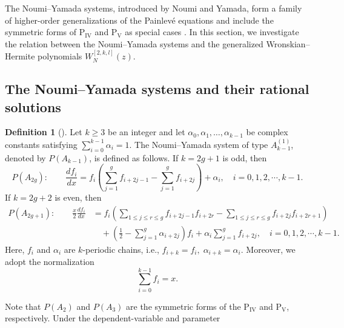 \documentclass[preprint,3p,10pt]{elsarticle}
\theoremstyle{definition}
\newtheorem{definition}{Definition}[section]
\begin{document}
The Noumi--Yamada systems, introduced by Noumi and Yamada, form a family of higher-order generalizations of the Painlev\'e equations and include the symmetric forms of P\(_{\mathrm{IV}}\) and P\(_{\mathrm{V}}\) as special cases \cite{noumi1998affine,noumi2004painleve,tsuda2005universal,gomez2021complete}. In this section, we investigate the relation between the Noumi--Yamada systems and the generalized Wronskian--Hermite polynomials \(W_N^{[2,k,l]}(z)\).


\subsection{The Noumi--Yamada systems and their rational solutions}
\begin{definition}[\cite{noumi1998affine}]
\label{def:Noumi--Yamada-Ak}
Let \(k\ge3\) be an integer and let $\alpha_0, \alpha_1, \ldots, \alpha_{k-1}$ be complex constants satisfying  $\sum_{i=0}^{k-1}\alpha_i=1$.  The Noumi--Yamada system of type \(A_{k-1}^{(1)}\),
denoted by \(P(A_{k-1})\), is defined as follows.
If \(k=2g+1\) is odd, then
\begin{equation}\label{eq:PA-even}
    P(A_{2g}):\qquad
    \frac{df_i}{dx}
    =
    f_i
    \left(
        \sum_{j=1}^{g} f_{i+2j-1}
        -
        \sum_{j=1}^{g} f_{i+2j}
    \right)
    +
    \alpha_i, \quad i=0,1,2,\cdots,k-1.
\end{equation}
If \(k=2g+2\) is even, then
\begin{equation}\label{eq:PA-odd}
\begin{aligned}
    P(A_{2g+1}):\qquad
    \frac{x}{2}\frac{df_i}{dx}
    &=
    f_i
    \left(
        \sum_{1\le j\le r\le g} f_{i+2j-1}f_{i+2r}
        -
        \sum_{1\le j\le r\le g} f_{i+2j}f_{i+2r+1}
    \right) \\
    &\quad
    +
    \left(
        \frac12-\sum_{j=1}^{g}\alpha_{i+2j}
    \right)f_i
    +
    \alpha_i\sum_{j=1}^{g}f_{i+2j}, \quad i=0,1,2,\cdots,k-1.
\end{aligned}
\end{equation}
Here, \(f_i\) and \(\alpha_i\) are \(k\)-periodic chains, i.e., $f_{i+k}=f_i, \; \alpha_{i+k}=\alpha_i$. Moreover, we adopt the normalization
\begin{equation}
    \sum_{i=0}^{k-1}f_i=x.
\end{equation}


\end{definition}
Note that \(P(A_2)\) and \(P(A_3)\) are the symmetric forms of the P\(_{\mathrm {IV}}\) and P\(_{\mathrm {V}}\), respectively. Under the dependent-variable and parameter
\end{document}
